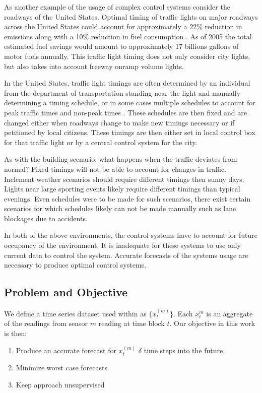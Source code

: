 As another example of the usage of complex control systems consider the roadways of the United States.  Optimal timing of traffic lights on major roadways across the United States could account for approximately a 22\% reduction in emissions along with a 10\% reduction in fuel consumption \cite{DOT2007}.  As of 2005 the total estimated fuel savings would amount to approximately 17 billions gallons of motor fuels annually.  This traffic light timing does not only consider city lights, but also takes into account freeway onramp volume lights.

In the United States, traffic light timings are often determined by an individual from the department of transportation standing near the light and manually determining a timing schedule, or in some cases multiple schedules to account for peak traffic times and non-peak times \cite{Koonce2008}.  These schedules are then fixed and are changed either when roadways change to make new timings necessary or if petitioned by local citizens.  These timings are then either set in local control box for that traffic light or by a central control system for the city.  

As with the building scenario, what happens when the traffic deviates from normal?  Fixed timings will not be able to account for changes in traffic.  Inclement weather scenarios should require different timings then sunny days.  Lights near large sporting events likely require different timings than typical evenings.  Even schedules were to be made for such scenarios, there exist certain scenarios for which schedules likely can not be made manually such as lane blockages due to accidents. 

In both of the above environments, the control systems have to account for future occupancy of the environment.  It is inadequate for these systems to use only current data to control the system.  Accurate forecasts of the systems usage are necessary to produce optimal control systems.  

\subsection{Problem and Objective}
We define a time series dataset used within as  $\{x_{t}^{(m)}\}$.  Each $x_{t}^{m}$ is an aggregate of the readings from sensor $m$ reading at time block $t$.  Our objective in this work is then:

\begin{enumerate}
\item{Produce an accurate forecast for $x_{t}^(m)$ $\delta$ time steps into the future.}
\item{Minimize worst case forecasts}
\item{Keep approach unsupervised}
\end{enumerate}

